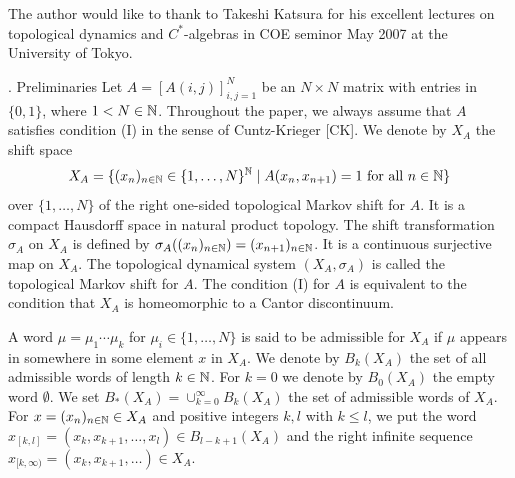 The author would like to thank to Takeshi Katsura for his excellent lectures 
on topological dynamics and $C^*$-algebras in COE seminor May 2007 at 
the University of Tokyo. 

. Preliminaries
\endheading
Let $A=[A(i,j)]_{i,j=1}^N$ 
be an $N\times N$ matrix with entries in $\{0,1\}$,
where $1< N \in {\Bbb N}$.
Throughout the paper, we always assume that 
$A$ satisfies condition (I) in the sense of Cuntz-Krieger [CK].
We denote by 
$X_A$ the shift space 
$$
X_A = \{ (x_n )_{n \in \Bbb N} \in \{1,\dots,N \}^{\Bbb N}
\mid
A(x_n,x_{n+1}) =1 \text{ for all } n \in {\Bbb N}
\}
$$
over $\{1,\dots,N\}$
of the right one-sided topological Markov shift for $A$.
It is a compact Hausdorff space in natural  product topology.
The shift transformation $\sigma_A$ on $X_A$ is defined by 
$\sigma_{A}((x_n)_{n \in \Bbb N})=(x_{n+1} )_{n \in \Bbb N}$.
It is a continuous surjective map on $X_A$.
The topological dynamical system 
$(X_A, \sigma_A)$ is called the topological Markov shift for $A$.
The condition (I) for $A$
is equivalent to the condition that $X_A$ is homeomorphic to a Cantor discontinuum.

A word $\mu = \mu_1 \cdots \mu_k$ for $\mu_i \in \{1,\dots,N\}$
is said to be admissible for $X_A$ 
if $\mu$ appears in somewhere in some element $x$ in $X_A$.
 We denote by 
$B_k(X_A)$ the set of all admissible words of length $k \in \Bbb N$.
For $k=0$ we denote by $B_0(X_A)$ the empty word $\emptyset$.
We set 
$B_*(X_A) = \cup_{k=0}^\infty B_k(X_A)$ 
the set of admissible words of $X_A$.
For $x = (x_n )_{n \in {\Bbb N}} \in X_A$ and positive integers $k,l$ with
$k\le l$, we put the word 
$x_{[k,l]} = (x_k,x_{k+1},\dots, x_l) \in B_{l-k +1}(X_A)$
and the right infinite sequence
$x_{[k,\infty)} =(x_k, x_{k+1}, \dots ) \in X_A$.


